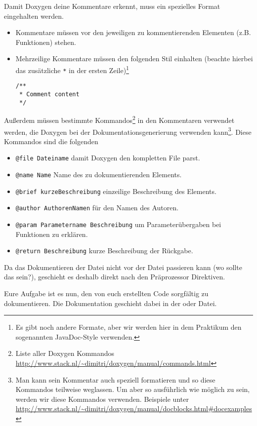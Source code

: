 Damit Doxygen deine Kommentare erkennt, muss ein spezielles Format eingehalten werden.
\begin{itemize}
    \item Kommentare müssen vor den jeweiligen zu kommentierenden Elementen (z.B. Funktionen) stehen.
    \item{Mehrzeilige Kommentare müssen den folgenden Stil einhalten (beachte hierbei das zusätzliche \lstinline{*} in der ersten Zeile)\footnote{Es gibt noch andere Formate, aber wir werden hier in dem Praktikum den sogenannten JavaDoc-Style verwenden.}
        \begin{lstlisting}
/**
 * Comment content
 */
        \end{lstlisting}}
\end{itemize}

Außerdem müssen bestimmte Kommandos\footnote{Liste aller Doxygen Kommandos \url{http://www.stack.nl/~dimitri/doxygen/manual/commands.html}} in den Kommentaren verwendet werden, die Doxygen bei der Dokumentationsgenerierung verwenden kann\footnote{Man kann sein Kommentar auch speziell formatieren und so diese Kommandos teilweise weglassen.
Um aber so ausführlich wie möglich zu sein, werden wir diese Kommandos verwenden.
Beispiele unter \url{http://www.stack.nl/~dimitri/doxygen/manual/docblocks.html\#docexamples}}.
Diese Kommandos sind die folgenden

\begin{itemize}
    \item \lstinline{@file Dateiname} damit Doxygen den kompletten File parst.
    \item \lstinline{@name Name} Name des zu dokumentierenden Elements.
    \item \lstinline{@brief kurzeBeschreibung} einzeilige Beschreibung des Elements.
    \item \lstinline{@author AuthorenNamen} für den Namen des Autoren.
    \item \lstinline{@param Parametername Beschreibung} um Parameterübergaben bei Funktionen zu erklären.
    \item \lstinline{@return Beschreibung} kurze Beschreibung der Rückgabe.
\end{itemize}

Da das Dokumentieren der Datei nicht vor der Datei passieren kann (wo sollte das sein?), geschieht es deshalb direkt nach den Präprozessor Direktiven.

Eure Aufgabe ist es nun, den von euch erstellten Code sorgfältig zu dokumentieren.
Die Dokumentation geschieht dabei in der  oder  Datei.


